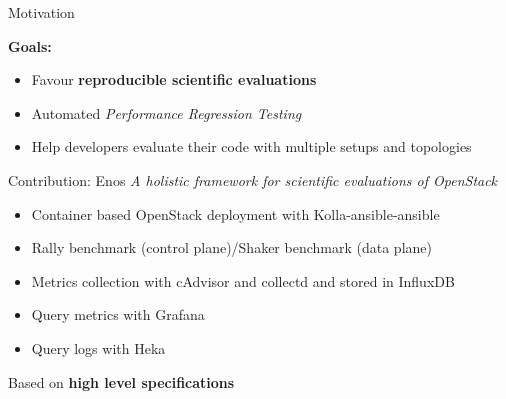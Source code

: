 \documentclass[10pt]{beamer}
\begin{document}
\begin{frame}{Motivation}

  \textbf{Goals:}
  \begin{itemize}
		\small
	 \item Favour \textbf{reproducible scientific evaluations}
	 \item Automated \emph{Performance Regression Testing}
	 \item Help developers evaluate their code with multiple setups and
		topologies
  \end{itemize}

  \vspace{.3cm}

\end{frame}


\begin{frame}{Contribution: Enos}
  \emph{A holistic framework for scientific evaluations of OpenStack}
  \vspace{.4cm}

  \begin{itemize}
	 \item Container based OpenStack deployment with Kolla-ansible-ansible
    \item Rally benchmark (control plane)/Shaker benchmark (data plane)
    \item Metrics collection with cAdvisor and collectd and stored in InfluxDB
    \item Query metrics with Grafana
    \item Query logs with Heka
  \end{itemize}

  Based on \textbf{high level specifications}
\end{frame}
\end{document}
